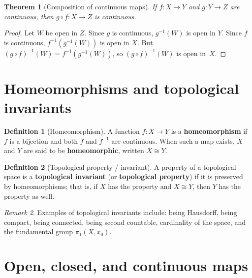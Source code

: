 \documentclass[11pt,a4paper,twoside]{book}
\newtheorem{theorem}{Theorem}[section]
\theoremstyle{remark}
\newtheorem{remark}[theorem]{Remark}
\theoremstyle{definition}
\theoremstyle{definition}
\newtheorem{definition}{Definition}[section]
\begin{document}
\begin{theorem}[Composition of continuous maps]
\label{thm:composition-continuous}
If $f\colon X\to Y$ and $g\colon Y\to Z$ are continuous, then
$g\circ f\colon X\to Z$ is continuous.
\end{theorem}

\begin{proof}
Let $W$ be open in $Z$.  Since $g$ is continuous, $g^{-1}(W)$ is open in $Y$.
Since $f$ is continuous, $f^{-1}(g^{-1}(W))$ is open in $X$.  But
$(g\circ f)^{-1}(W)=f^{-1}(g^{-1}(W))$, so $(g\circ f)^{-1}(W)$ is open
in~$X$.
\end{proof}

\section{Homeomorphisms and topological invariants}
\label{sec:homeomorphisms}

\begin{definition}[Homeomorphism]
\label{def:homeomorphism}
A function $f\colon X\to Y$ is a \textbf{homeomorphism} if $f$ is a bijection
and both $f$ and $f^{-1}$ are continuous.  When such a map exists, $X$ and $Y$
are said to be \textbf{homeomorphic}, written $X\cong Y$.
\end{definition}

\begin{definition}[Topological property / invariant]
\label{def:topological-invariant}
A property of a topological space is a \textbf{topological invariant} (or
\textbf{topological property}) if it is preserved by homeomorphisms; that is,
if $X$ has the property and $X\cong Y$, then $Y$ has the property as well.
\end{definition}

\begin{remark}
\label{rem:invariant-examples}
Examples of topological invariants include: being Hausdorff, being compact,
being connected, being second countable, cardinality of the space, and
the fundamental group $\pi_1(X,x_0)$.
\end{remark}

\section{Open, closed, and continuous maps}
\label{sec:open-closed-maps}
\end{document}
